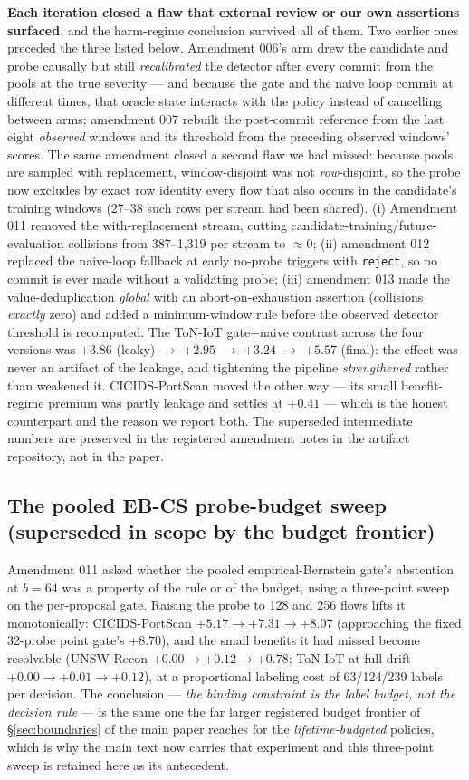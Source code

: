 \documentclass[a4paper,11pt]{article}
\makeatletter
\let\supp@subsection\subsection
\renewcommand{\subsection}{\FloatBarrier\supp@subsection}
\makeatother
\begin{document}
\textbf{Each iteration closed a flaw that external review or our own assertions surfaced},
and the harm-regime conclusion survived all of them. Two earlier ones preceded the three
listed below. Amendment 006's arm drew the candidate and probe causally but still
\emph{recalibrated} the detector after every commit from the pools at the true severity ---
and because the gate and the naive loop commit at different times, that oracle state
interacts with the policy instead of cancelling between arms; amendment 007 rebuilt the
post-commit reference from the last eight \emph{observed} windows and its threshold from the
preceding observed windows' scores. The same amendment closed a second flaw we had missed:
because pools are sampled with replacement, window-disjoint was not \emph{row}-disjoint, so
the probe now excludes by exact row identity every flow that also occurs in the candidate's
training windows (27--38 such rows per stream had been shared). (i) Amendment 011 removed the
with-replacement stream, cutting candidate-training/future-evaluation collisions from
387--1{,}319 per stream to ${\approx}0$; (ii) amendment 012 replaced the naive-loop fallback
at early no-probe triggers with \texttt{reject}, so no commit is ever made without a
validating probe; (iii) amendment 013 made the value-deduplication \emph{global} with an
abort-on-exhaustion assertion (collisions \emph{exactly} zero) and added a minimum-window
rule before the observed detector threshold is recomputed. The ToN-IoT gate$-$naive contrast
across the four versions was $+3.86$ (leaky) $\to$ $+2.95$ $\to$ $+3.24$ $\to$ $+5.57$
(final): the effect was never an artifact of the leakage, and tightening the pipeline
\emph{strengthened} rather than weakened it. CICIDS-PortScan moved the other way --- its
small benefit-regime premium was partly leakage and settles at $+0.41$ --- which is the
honest counterpart and the reason we report both. The superseded intermediate numbers are
preserved in the registered amendment notes in the artifact repository, not in the paper.

\subsection{The pooled EB-CS probe-budget sweep (superseded in scope by the budget frontier)}

Amendment 011 asked whether the pooled empirical-Bernstein gate's abstention at $b{=}64$ was
a property of the rule or of the budget, using a three-point sweep on the per-proposal gate.
Raising the probe to 128 and 256 flows lifts it monotonically: CICIDS-PortScan
$+5.17 \to +7.31 \to +8.07$ (approaching the fixed 32-probe point gate's $+8.70$), and the
small benefits it had missed become resolvable (UNSW-Recon $+0.00 \to +0.12 \to +0.78$;
ToN-IoT at full drift $+0.00 \to +0.01 \to +0.12$), at a proportional labeling cost of
63/124/239 labels per decision. The conclusion --- \emph{the binding constraint is the label
budget, not the decision rule} --- is the same one the far larger registered budget frontier
of \S\ref{sec:boundaries} of the main paper reaches for the \emph{lifetime-budgeted} policies, which is why
the main text now carries that experiment and this three-point sweep is retained here as its
antecedent.
\end{document}
